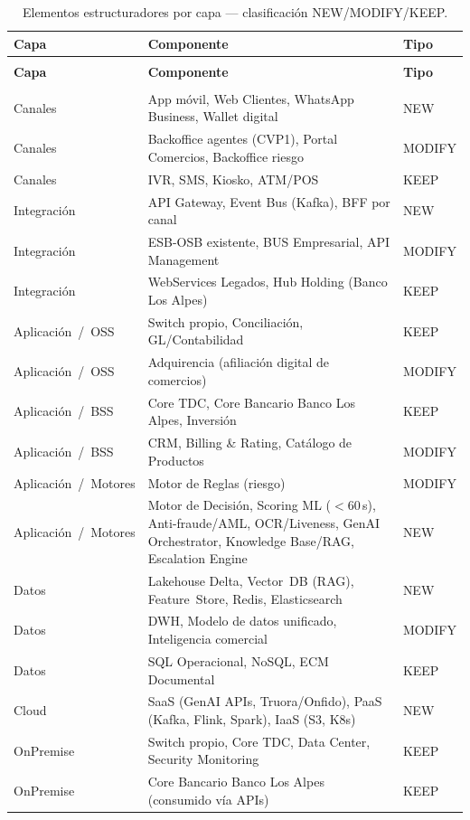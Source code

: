\documentclass[11pt,letterpaper]{article}
\begin{document}
{\small
\renewcommand{\arraystretch}{1.2}
\begin{xltabular}{\textwidth}{@{}>{\RaggedRight\arraybackslash}p{3.4cm}@{\hspace{6pt}}>{\RaggedRight\arraybackslash}X@{\hspace{6pt}}>{\RaggedRight\arraybackslash}p{1.8cm}@{}}
\caption{Elementos estructuradores por capa — clasificación NEW/MODIFY/KEEP.\label{tab:estructuradores}}\\
\toprule
\textbf{Capa} & \textbf{Componente} & \textbf{Tipo} \\
\midrule
\endfirsthead
{}\\
\toprule
\textbf{Capa} & \textbf{Componente} & \textbf{Tipo} \\
\midrule
\endhead
\midrule
{}\\
\endfoot
\bottomrule
\endlastfoot
Canales & App móvil, Web Clientes, WhatsApp Business, Wallet digital & NEW \\
Canales & Backoffice agentes (CVP1), Portal Comercios, Backoffice riesgo & MODIFY \\
Canales & IVR, SMS, Kiosko, ATM/POS & KEEP \\
\midrule
Integración & API Gateway, Event Bus (Kafka), BFF por canal & NEW \\
Integración & ESB-OSB existente, BUS Empresarial, API Management & MODIFY \\
Integración & WebServices Legados, Hub Holding (Banco Los Alpes) & KEEP \\
\midrule
Aplicación~/~OSS & Switch propio, Conciliación, GL/Contabilidad & KEEP \\
Aplicación~/~OSS & Adquirencia (afiliación digital de comercios) & MODIFY \\
Aplicación~/~BSS & Core TDC, Core Bancario Banco Los Alpes, Inversión & KEEP \\
Aplicación~/~BSS & CRM, Billing \& Rating, Catálogo de Productos & MODIFY \\
Aplicación~/~Motores & Motor de Reglas (riesgo) & MODIFY \\
Aplicación~/~Motores & Motor de Decisión, Scoring ML ($<60$\,s), Anti-fraude/AML, OCR/Liveness, GenAI Orchestrator, Knowledge Base/RAG, Escalation Engine & NEW \\
\midrule
Datos & Lakehouse Delta, Vector~DB (RAG), Feature~Store, Redis, Elasticsearch & NEW \\
Datos & DWH, Modelo de datos unificado, Inteligencia comercial & MODIFY \\
Datos & SQL Operacional, NoSQL, ECM Documental & KEEP \\
\midrule
Cloud & SaaS (GenAI APIs, Truora/Onfido), PaaS (Kafka, Flink, Spark), IaaS (S3, K8s) & NEW \\
\midrule
OnPremise & Switch propio, Core TDC, Data Center, Security Monitoring & KEEP \\
OnPremise & Core Bancario Banco Los Alpes (consumido vía APIs) & KEEP \\
\end{xltabular}}
\end{document}

